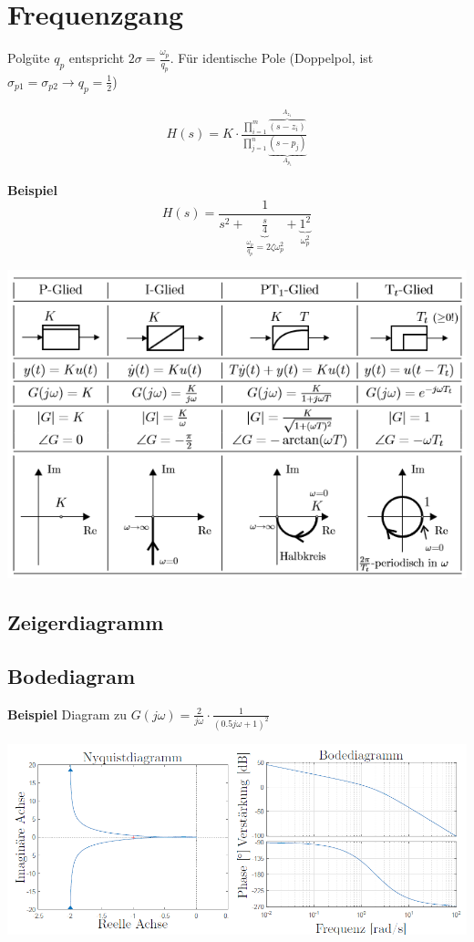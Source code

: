 \section{Frequenzgang}
Polgüte $q_p$ entspricht $2\sigma = \frac{\omega_p}{q_p}$. Für identische Pole (Doppelpol, ist $\sigma_{p1} = \sigma_{p2} \xrightarrow{} q_p = \frac{1}{2}$)

\begin{align*}
	H(s) = K \cdot \frac{\prod\limits_{i=1}^{m}\overbrace{(s - z_i)}^{A_{z_1}}}{\prod\limits_{j=1}^{n}\underbrace{(s - p_j)}_{A_{p_1}}}
\end{align*}


\noindent\textbf{Beispiel}
\[
H(s) = \frac{1}{s^2 + \underbrace{\frac{s}{4}}_{\frac{\omega_p}{q_p} = 2 \zeta \omega_p^2} + \underbrace{1^2}_{\omega_p^2}}
\]

\begin{center}
	\includegraphics[width=\columnwidth]{Images/frequenzgang_grundglieder}
\end{center}


\subsection{Zeigerdiagramm}

\subsection{Bodediagram}
\noindent\textbf{Beispiel}
Diagram zu $G(j\omega) = \frac{2}{j\omega}\cdot \frac{1}{(0.5j\omega + 1)^2}$
\begin{center}
	\includegraphics[width=\columnwidth]{Images/bode}
\end{center}


